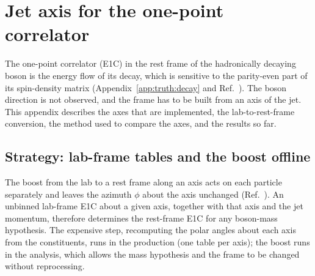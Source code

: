 \section{Jet axis for the one-point correlator}
\label{app:axes}

The one-point correlator (E1C) in the rest frame of the hadronically decaying boson is the energy flow of its decay,
which is sensitive to the parity-even part of its spin-density matrix (Appendix~\ref{app:truth:decay}
and Ref.~\cite[App.~D]{Gao:2026bvp}). The boson direction is not observed, and the frame has to be built from an axis
of the jet. This appendix describes the axes that are implemented, the lab-to-rest-frame conversion, the method used
to compare the axes, and the results so far.

\subsection{Strategy: lab-frame tables and the boost offline}
\label{app:axes:strategy}
The boost from the lab to a rest frame along an axis acts on each particle separately and leaves the azimuth $\phi$
about the axis unchanged (Ref.~\cite[App.~D]{Gao:2026bvp}). An unbinned lab-frame E1C about a given axis, together with
that axis and the jet momentum, therefore determines the rest-frame E1C for any boson-mass hypothesis. The expensive
step, recomputing the polar angles about each axis from the constituents, runs in the production (one table per
axis); the boost runs in the analysis, which allows the mass hypothesis and the frame to be changed without
reprocessing.

